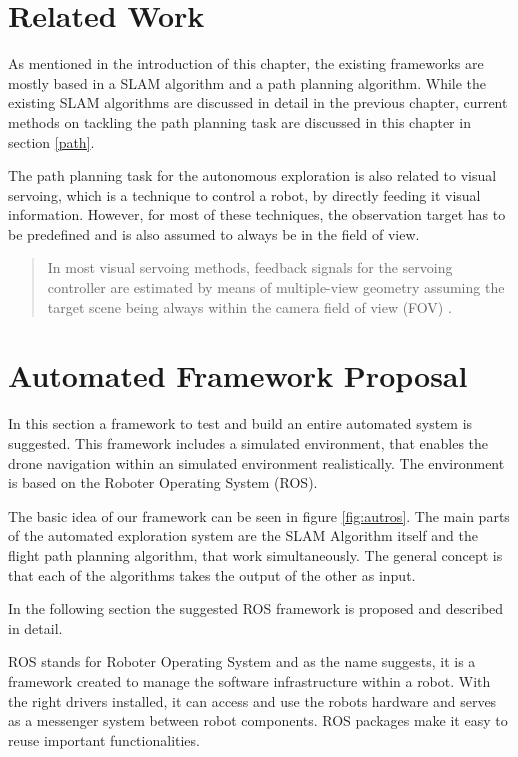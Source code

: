 \section{Related Work}

	As mentioned in the introduction of this chapter, the existing frameworks are mostly based in a SLAM algorithm and a path planning algorithm. While 
	the existing SLAM algorithms are discussed in detail in the previous chapter, current methods on tackling the path planning task are 
	discussed in this chapter in section \ref{path}. 
	
	The path planning task for the autonomous exploration is also related to visual servoing, which is a technique to control a robot, by 
	directly feeding it visual information. However, for most of these techniques, the observation target has to be predefined and is also assumed 
	to always be in the field of view. 
	
	\begin{quote}
	
	In most visual servoing methods, feedback signals for the servoing
	controller are estimated by means of multiple-view geometry assuming 
	the target scene being always within the camera field of view (FOV) \cite{servo}.
	
	\end{quote}
	
\section{Automated Framework Proposal} \label{rosframe}
	
	In this section a framework to test and build an entire automated system is suggested. This framework includes a 
	simulated environment, that enables the drone navigation within an simulated environment realistically. The environment 
	is based on the Roboter Operating System (ROS).
	
	The basic idea of our framework can be seen in figure \ref{fig:autros}. The main parts of the automated exploration system are the SLAM Algorithm itself
	and the flight path planning algorithm, that work simultaneously. The general concept is that each of the algorithms takes the output of the other as 
	input. 
	
	In the following section the suggested ROS framework is proposed and described in detail. 
		
	ROS stands for Roboter Operating System and as the name suggests, it is a framework created to manage the software infrastructure within a robot. With the right drivers installed, 
	it can access and use the robots hardware and serves as a messenger system between robot components. ROS packages make it easy to 
	reuse important functionalities.


